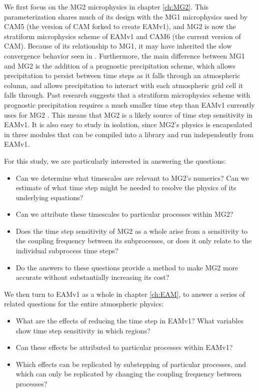 \documentclass [11pt, proquest] {uwthesis}[2020/02/24]
\begin{document}
We first focus on the MG2 microphysics in chapter \ref{ch:MG2}. This parameterization shares much of its design with the MG1 microphysics used by CAM5 (the version of CAM forked to create EAMv1), and MG2 is now the stratiform microphysics scheme of EAMv1 and CAM6 (the current version of CAM). Because of its relationship to MG1, it may have inherited the slow convergence behavior seen in \textcite{Wan2015}. Furthermore, the main difference between MG1 and MG2 is the addition of a prognostic precipitation scheme, which allows precipitation to persist between time steps as it falls through an atmospheric column, and allows precipitation to interact with each atmospheric grid cell it falls through. Past research suggests that a stratiform microphysics scheme with prognostic precipitation requires a much smaller time step than EAMv1 currently uses for MG2 \parencite{Posselt2008,Chosson2014}. This means that MG2 is a likely source of time step sensitivity in EAMv1. It is also easy to study in isolation, since MG2's physics is encapsulated in three modules that can be compiled into a library and run independently from EAMv1.

For this study, we are particularly interested in answering the questions:

\begin{itemize}
    \item Can we determine what timescales are relevant to MG2's numerics? Can we estimate of what time step might be needed to resolve the physics of its underlying equations?
    \item Can we attribute these timescales to particular processes within MG2?
    \item Does the time step sensitivity of MG2 as a whole arise from a sensitivity to the coupling frequency between its subprocesses, or does it only relate to the individual subprocess time steps?
    \item Do the answers to these questions provide a method to make MG2 more accurate without substantially increasing its cost?
\end{itemize}

We then turn to EAMv1 as a whole in chapter \ref{ch:EAM}, to answer a series of related questions for the entire atmospheric physics:

\begin{itemize}
    \item What are the effects of reducing the time step in EAMv1? What variables show time step sensitivity in which regions?
    \item Can these effects be attributed to particular processes within EAMv1?
    \item Which effects can be replicated by substepping of particular processes, and which can only be replicated by changing the coupling frequency between processes?
\end{itemize}
\end{document}
